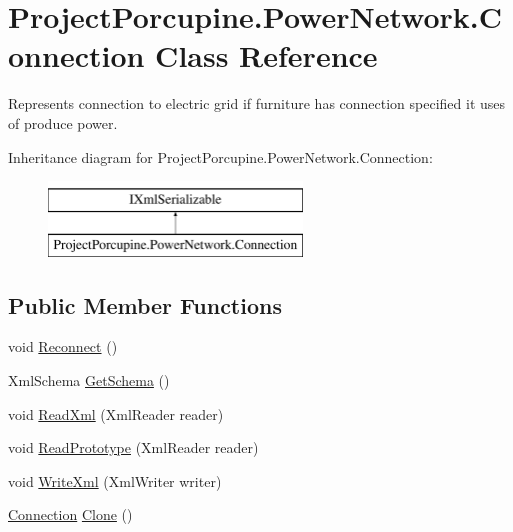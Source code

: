 \hypertarget{class_project_porcupine_1_1_power_network_1_1_connection}{}\section{Project\+Porcupine.\+Power\+Network.\+Connection Class Reference}
\label{class_project_porcupine_1_1_power_network_1_1_connection}


Represents connection to electric grid if furniture has connection specified it uses of produce power.  


Inheritance diagram for Project\+Porcupine.\+Power\+Network.\+Connection\+:\begin{figure}[H]
\begin{center}
\leavevmode
\includegraphics[height=2.000000cm]{class_project_porcupine_1_1_power_network_1_1_connection}
\end{center}
\end{figure}
\subsection*{Public Member Functions}
\begin{DoxyCompactItemize}
\item 
void \hyperlink{class_project_porcupine_1_1_power_network_1_1_connection_ad3278a48cfb6938feae85814bf0c709b}{Reconnect} ()
\item 
Xml\+Schema \hyperlink{class_project_porcupine_1_1_power_network_1_1_connection_a94acb5c7ed80636afb3e6c441b134971}{Get\+Schema} ()
\item 
void \hyperlink{class_project_porcupine_1_1_power_network_1_1_connection_aea6a9f9e413484f24a19c378f74a3500}{Read\+Xml} (Xml\+Reader reader)
\item 
void \hyperlink{class_project_porcupine_1_1_power_network_1_1_connection_a934d1ff2b1af409c86f2308407d0f039}{Read\+Prototype} (Xml\+Reader reader)
\item 
void \hyperlink{class_project_porcupine_1_1_power_network_1_1_connection_a153d19836727ecfd020d674b5a915d82}{Write\+Xml} (Xml\+Writer writer)
\item 
\hyperlink{class_project_porcupine_1_1_power_network_1_1_connection}{Connection} \hyperlink{class_project_porcupine_1_1_power_network_1_1_connection_a7696b642ee26d86d3f11aa940cc9588b}{Clone} ()
\end{DoxyCompactItemize}
